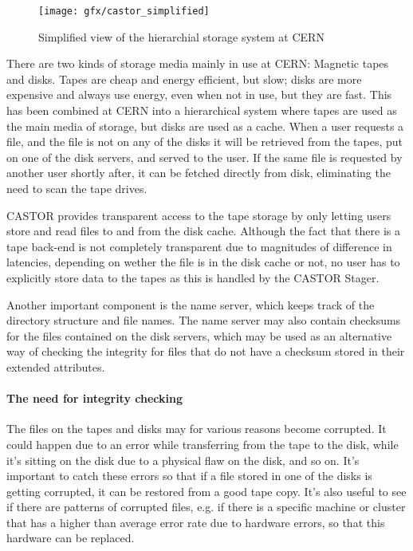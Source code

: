\begin{figure}[ht]
\centering
\texttt{[image: gfx/castor\_simplified]}
\caption{Simplified view of the hierarchial storage system at CERN}
\label{fig:castor}
\end{figure}

There are two kinds of storage media mainly in use at CERN: Magnetic tapes and disks. Tapes are cheap and energy efficient, but slow; disks are more expensive and always use energy, even when not in use, but they are fast. This has been combined at CERN into a hierarchical system where tapes are used as the main media of storage, but disks are used as a cache. When a user requests a file, and the file is not on any of the disks it will be retrieved from the tapes, put on one of the disk servers, and served to the user. If the same file is requested by another user shortly after, it can be fetched directly from disk, eliminating the need to scan the tape drives.

CASTOR provides transparent access to the tape storage by only letting users store and read files to and from the disk cache. Although the fact that there is a tape back-end is not completely transparent due to magnitudes of difference in latencies, depending on wether the file is in the disk cache or not, no user has to explicitly store data to the tapes as this is handled by the CASTOR Stager. 

Another important component is the name server, which keeps track of the directory structure and file names. The name server may also contain checksums for the files contained on the disk servers, which may be used as an alternative way of checking the integrity for files that do not have a checksum stored in their extended attributes.

\paragraph{The need for integrity checking}
The files on the tapes and disks may for various reasons become corrupted. It could happen due to an error while transferring from the tape to the disk, while it's sitting on the disk due to a physical flaw on the disk, and so on. It's important to catch these errors so that if a file stored in one of the disks is getting corrupted, it can be restored from a good tape copy. It's also useful to see if there are patterns of corrupted files, e.g. if there is a specific machine or cluster that has a higher than average error rate due to hardware errors, so that this hardware can be replaced.

